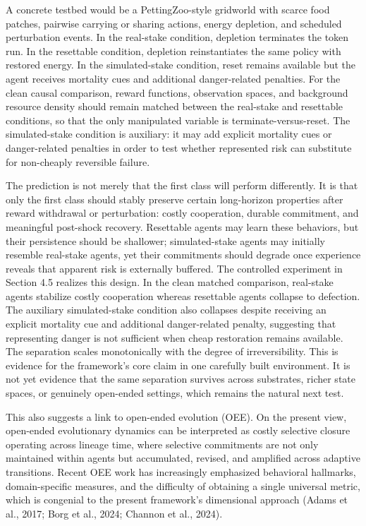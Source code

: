 \documentclass[Afour,sageh,times,doublespace]{sagej}
\begin{document}
A concrete testbed would be a PettingZoo-style gridworld with scarce food patches, pairwise carrying or sharing actions, energy depletion, and scheduled perturbation events. In the real-stake condition, depletion terminates the token run. In the resettable condition, depletion reinstantiates the same policy with restored energy. In the simulated-stake condition, reset remains available but the agent receives mortality cues and additional danger-related penalties. For the clean causal comparison, reward functions, observation spaces, and background resource density should remain matched between the real-stake and resettable conditions, so that the only manipulated variable is terminate-versus-reset. The simulated-stake condition is auxiliary: it may add explicit mortality cues or danger-related penalties in order to test whether represented risk can substitute for non-cheaply reversible failure.

The prediction is not merely that the first class will perform differently. It is that only the first class should stably preserve certain long-horizon properties after reward withdrawal or perturbation: costly cooperation, durable commitment, and meaningful post-shock recovery. Resettable agents may learn these behaviors, but their persistence should be shallower; simulated-stake agents may initially resemble real-stake agents, yet their commitments should degrade once experience reveals that apparent risk is externally buffered. The controlled experiment in Section 4.5 realizes this design. In the clean matched comparison, real-stake agents stabilize costly cooperation whereas resettable agents collapse to defection. The auxiliary simulated-stake condition also collapses despite receiving an explicit mortality cue and additional danger-related penalty, suggesting that representing danger is not sufficient when cheap restoration remains available. The separation scales monotonically with the degree of irreversibility. This is evidence for the framework's core claim in one carefully built environment. It is not yet evidence that the same separation survives across substrates, richer state spaces, or genuinely open-ended settings, which remains the natural next test.

This also suggests a link to open-ended evolution (OEE). On the present view, open-ended evolutionary dynamics can be interpreted as costly selective closure operating across lineage time, where selective commitments are not only maintained within agents but accumulated, revised, and amplified across adaptive transitions. Recent OEE work has increasingly emphasized behavioral hallmarks, domain-specific measures, and the difficulty of obtaining a single universal metric, which is congenial to the present framework's dimensional approach (Adams et al., 2017; Borg et al., 2024; Channon et al., 2024).
\end{document}
